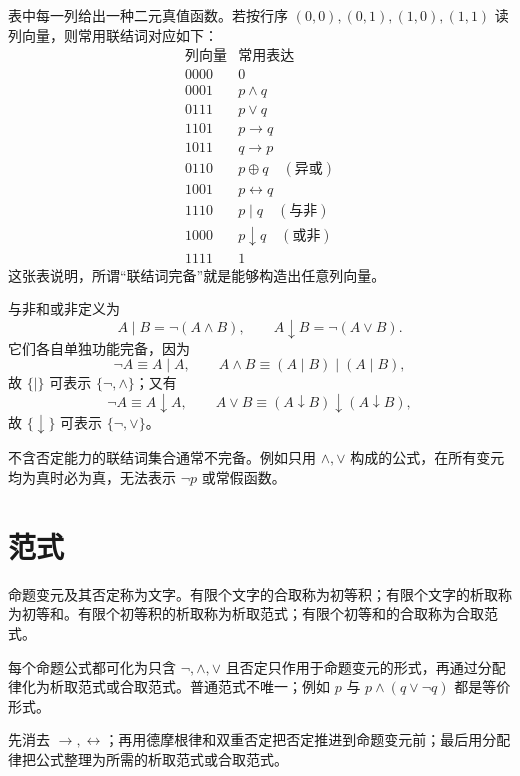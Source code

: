 表中每一列给出一种二元真值函数。若按行序 $(0,0),(0,1),(1,0),(1,1)$ 读列向量，则常用联结词对应如下：
\[
\begin{array}{c|c}
\text{列向量} & \text{常用表达}\\ \hline
0000 & 0\\
0001 & p\land q\\
0111 & p\lor q\\
1101 & p\to q\\
1011 & q\to p\\
0110 & p\oplus q\quad(\text{异或})\\
1001 & p\leftrightarrow q\\
1110 & p\mid q\quad(\text{与非})\\
1000 & p\downarrow q\quad(\text{或非})\\
1111 & 1
\end{array}
\]
这张表说明，所谓“联结词完备”就是能够构造出任意列向量。

与非和或非定义为
\[
A\mid B=\neg(A\land B),\qquad A\downarrow B=\neg(A\lor B).
\]
它们各自单独功能完备，因为
\[
\neg A\equiv A\mid A,\qquad
A\land B\equiv(A\mid B)\mid(A\mid B),
\]
故 $\{\mid\}$ 可表示 $\{\neg,\land\}$；又有
\[
\neg A\equiv A\downarrow A,\qquad
A\lor B\equiv(A\downarrow B)\downarrow(A\downarrow B),
\]
故 $\{\downarrow\}$ 可表示 $\{\neg,\lor\}$。

不含否定能力的联结词集合通常不完备。例如只用 $\land,\lor$ 构成的公式，在所有变元均为真时必为真，无法表示 $\neg p$ 或常假函数。

\clearpage
\section{范式}

\begin{definition}\label{ch1-normal-form}
命题变元及其否定称为文字。有限个文字的合取称为初等积；有限个文字的析取称为初等和。有限个初等积的析取称为析取范式；有限个初等和的合取称为合取范式。
\end{definition}

每个命题公式都可化为只含 $\neg,\land,\lor$ 且否定只作用于命题变元的形式，再通过分配律化为析取范式或合取范式。普通范式不唯一；例如 $p$ 与 $p\land(q\lor\neg q)$ 都是等价形式。

\begin{method}[化范式的一般步骤]\label{ch1-nf-method}
先消去 $\to,\leftrightarrow$；再用德摩根律和双重否定把否定推进到命题变元前；最后用分配律把公式整理为所需的析取范式或合取范式。
\end{method}

